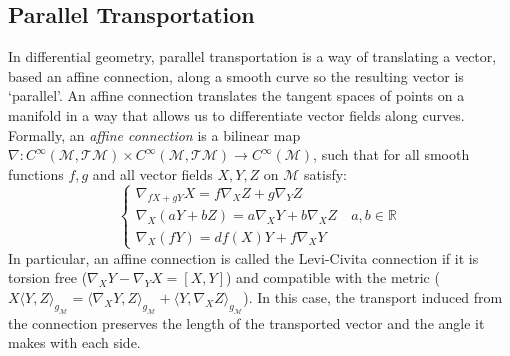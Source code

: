 \documentclass[10pt,twocolumn,letterpaper]{article}
\def\M{\mathcal{M}}
\def\T{\mathcal{T}}
\def\RR{\mathbb{R}}
\begin{document}
\subsection{Parallel Transportation}
\label{subsec:PT}
In differential geometry, parallel transportation is a way of translating a vector, based an affine connection, along a smooth curve so the resulting vector is `parallel'. An affine connection translates the tangent spaces of points on a manifold in a way that allows us to differentiate vector fields along curves. Formally, an {\it affine connection} is a bilinear map $\nabla: C^{\infty}(\M, \T \M) \times C^{\infty}(\M, \T \M) \rightarrow C^{\infty}(\M)$, such that for all smooth functions $f, g$ and all vector fields $X,Y, Z$ on $\M$ satisfy:
%
\begin{equation}
\left\{\begin{array}{c}
\nabla_{fX + gY} X = f \nabla_X Z + g \nabla_Y Z \qquad \quad \\
\nabla_{X} (aY + bZ) = a \nabla_X Y + b \nabla_X Z  \quad a, b \in \RR \\
\nabla_X (fY) = df(X)Y+f\nabla_X Y  \qquad
\end{array}
\right.
\end{equation}
%
In particular, an affine connection is called the Levi-Civita connection if it is torsion free ($\nabla_X Y - \nabla_Y X = [X,Y]$) and compatible with the metric ( $X\langle Y,Z\rangle_{g_\M} = \langle\nabla_X Y,Z\rangle_{g_\M} + \langle Y,\nabla_X Z\rangle_{g_\M}$).
In this case, the transport induced from the connection preserves the length of the transported vector and the angle it makes with each side.
\end{document}

